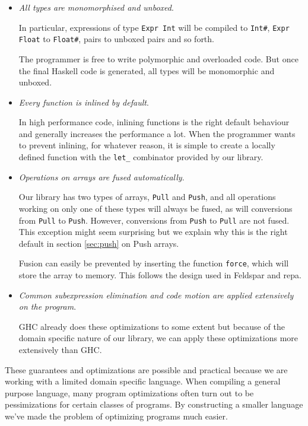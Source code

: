 \documentclass[preprint]{sigplanconf}
\begin{document}
\begin{itemize}
\item
  \emph{All types are monomorphised and unboxed}.

  In particular, expressions of type \texttt{Expr Int} will be compiled
  to \texttt{Int\#}, \texttt{Expr Float} to \texttt{Float\#}, pairs to
  unboxed pairs and so forth.

  The programmer is free to write polymorphic and overloaded code. But
  once the final Haskell code is generated, all types will be
  monomorphic and unboxed.
\item
  \emph{Every function is inlined by default}.

  In high performance code, inlining functions is the right default
  behaviour and generally increases the performance a lot. When the
  programmer wants to prevent inlining, for whatever reason, it is
  simple to create a locally defined function with the \texttt{let\_}
  combinator provided by our library.
\item
  \emph{Operations on arrays are fused automatically}.

  Our library has two types of arrays, \texttt{Pull} and \texttt{Push},
  and all operations working on only one of these types will always be
  fused, as will conversions from \texttt{Pull} to \texttt{Push}.
  However, conversions from \texttt{Push} to \texttt{Pull} are not
  fused. This exception might seem surprising but we explain why this is
  the right default in section \ref{sec:push} on Push arrays.

  Fusion can easily be prevented by inserting the function
  \texttt{force}, which will store the array to memory. This follows the
  design used in Feldspar and repa.
\item
  \emph{Common subexpression elimination and code motion are applied
  extensively on the program}.

  GHC already does these optimizations to some extent but because of the
  domain specific nature of our library, we can apply these
  optimizations more extensively than GHC.
\end{itemize}

These guarantees and optimizations are possible and practical because we
are working with a limited domain specific language. When compiling a
general purpose language, many program optimizations often turn out to
be pessimizations for certain classes of programs. By constructing a
smaller language we've made the problem of optimizing programs much
easier.
\end{document}
